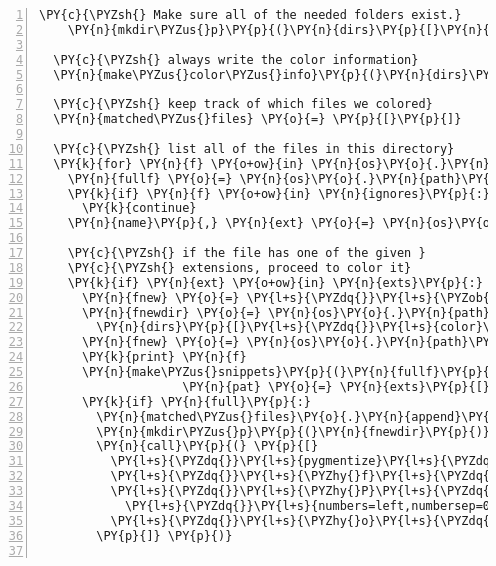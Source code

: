 \begin{Verbatim}[commandchars=\\\{\},numbers=left,numbersep=0.5em]
    \PY{c}{\PYZsh{} Make sure all of the needed folders exist.}
    \PY{n}{mkdir\PYZus{}p}\PY{p}{(}\PY{n}{dirs}\PY{p}{[}\PY{n}{d}\PY{p}{]}\PY{p}{)}

  \PY{c}{\PYZsh{} always write the color information}
  \PY{n}{make\PYZus{}color\PYZus{}info}\PY{p}{(}\PY{n}{dirs}\PY{p}{[}\PY{l+s}{\PYZdq{}}\PY{l+s}{colorinfo}\PY{l+s}{\PYZdq{}}\PY{p}{]}\PY{p}{,} \PY{n}{colorscheme}\PY{p}{)}

  \PY{c}{\PYZsh{} keep track of which files we colored}
  \PY{n}{matched\PYZus{}files} \PY{o}{=} \PY{p}{[}\PY{p}{]}
    
  \PY{c}{\PYZsh{} list all of the files in this directory}
  \PY{k}{for} \PY{n}{f} \PY{o+ow}{in} \PY{n}{os}\PY{o}{.}\PY{n}{listdir}\PY{p}{(}\PY{n}{indir}\PY{p}{)}\PY{p}{:}
    \PY{n}{fullf} \PY{o}{=} \PY{n}{os}\PY{o}{.}\PY{n}{path}\PY{o}{.}\PY{n}{join}\PY{p}{(}\PY{n}{indir}\PY{p}{,}\PY{n}{f}\PY{p}{)}
    \PY{k}{if} \PY{n}{f} \PY{o+ow}{in} \PY{n}{ignores}\PY{p}{:}
      \PY{k}{continue}
    \PY{n}{name}\PY{p}{,} \PY{n}{ext} \PY{o}{=} \PY{n}{os}\PY{o}{.}\PY{n}{path}\PY{o}{.}\PY{n}{splitext}\PY{p}{(} \PY{n}{f} \PY{p}{)}
    
    \PY{c}{\PYZsh{} if the file has one of the given }
    \PY{c}{\PYZsh{} extensions, proceed to color it}
    \PY{k}{if} \PY{n}{ext} \PY{o+ow}{in} \PY{n}{exts}\PY{p}{:}
      \PY{n}{fnew} \PY{o}{=} \PY{l+s}{\PYZdq{}}\PY{l+s}{\PYZob{}\PYZcb{}.tex}\PY{l+s}{\PYZdq{}}\PY{o}{.}\PY{n}{format}\PY{p}{(}\PY{n}{name}\PY{p}{,} \PY{n}{ext}\PY{p}{[}\PY{l+m+mi}{1}\PY{p}{:}\PY{p}{]}\PY{p}{)}
      \PY{n}{fnewdir} \PY{o}{=} \PY{n}{os}\PY{o}{.}\PY{n}{path}\PY{o}{.}\PY{n}{join}\PY{p}{(}
        \PY{n}{dirs}\PY{p}{[}\PY{l+s}{\PYZdq{}}\PY{l+s}{color}\PY{l+s}{\PYZdq{}}\PY{p}{]}\PY{p}{,} \PY{n}{ext}\PY{p}{[}\PY{l+m+mi}{1}\PY{p}{:}\PY{p}{]}\PY{p}{)}
      \PY{n}{fnew} \PY{o}{=} \PY{n}{os}\PY{o}{.}\PY{n}{path}\PY{o}{.}\PY{n}{join}\PY{p}{(}\PY{n}{fnewdir}\PY{p}{,} \PY{n}{fnew}\PY{p}{)}
      \PY{k}{print} \PY{n}{f}
      \PY{n}{make\PYZus{}snippets}\PY{p}{(}\PY{n}{fullf}\PY{p}{,} \PY{n}{dirs}\PY{p}{[}\PY{l+s}{\PYZdq{}}\PY{l+s}{snippets}\PY{l+s}{\PYZdq{}}\PY{p}{]}\PY{p}{,}
                    \PY{n}{pat} \PY{o}{=} \PY{n}{exts}\PY{p}{[}\PY{n}{ext}\PY{p}{]}\PY{p}{)}
      \PY{k}{if} \PY{n}{full}\PY{p}{:}
        \PY{n}{matched\PYZus{}files}\PY{o}{.}\PY{n}{append}\PY{p}{(}\PY{p}{(}\PY{n}{name}\PY{p}{,} \PY{n}{ext}\PY{p}{[}\PY{l+m+mi}{1}\PY{p}{:}\PY{p}{]}\PY{p}{)}\PY{p}{)}
        \PY{n}{mkdir\PYZus{}p}\PY{p}{(}\PY{n}{fnewdir}\PY{p}{)}
        \PY{n}{call}\PY{p}{(} \PY{p}{[}
          \PY{l+s}{\PYZdq{}}\PY{l+s}{pygmentize}\PY{l+s}{\PYZdq{}}\PY{p}{,}
          \PY{l+s}{\PYZdq{}}\PY{l+s}{\PYZhy{}f}\PY{l+s}{\PYZdq{}}\PY{p}{,} \PY{l+s}{\PYZdq{}}\PY{l+s}{latex}\PY{l+s}{\PYZdq{}}\PY{p}{,}
          \PY{l+s}{\PYZdq{}}\PY{l+s}{\PYZhy{}P}\PY{l+s}{\PYZdq{}}\PY{p}{,} \PY{l+s}{\PYZdq{}}\PY{l+s}{verboptions=\PYZob{}\PYZcb{}}\PY{l+s}{\PYZdq{}}\PY{o}{.}\PY{n}{format}\PY{p}{(}
            \PY{l+s}{\PYZdq{}}\PY{l+s}{numbers=left,numbersep=0.5em}\PY{l+s}{\PYZdq{}}\PY{p}{)}\PY{p}{,}
          \PY{l+s}{\PYZdq{}}\PY{l+s}{\PYZhy{}o}\PY{l+s}{\PYZdq{}}\PY{p}{,}  \PY{n}{fnew}\PY{p}{,} \PY{n}{fullf}
        \PY{p}{]} \PY{p}{)}
        

\end{Verbatim}
